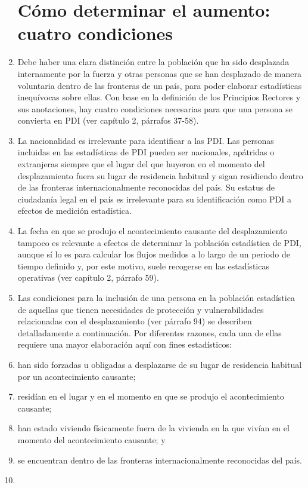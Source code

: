 \documentclass[
]{book}
\begin{document}
\begin{enumerate}
{  \section{Cómo determinar el aumento: cuatro condiciones}\label{cuxf3mo-determinar-el-aumento-cuatro-condiciones}}
\item
  Debe haber una clara distinción entre la población que ha sido desplazada internamente por la fuerza y otras personas que se han desplazado de manera voluntaria dentro de las fronteras de un país, para poder elaborar estadísticas inequívocas sobre ellas. Con base en la definición de los Principios Rectores y sus anotaciones, hay cuatro condiciones necesarias para que una persona se convierta en PDI (ver capítulo 2, párrafos 37-58).
\item
  La nacionalidad es irrelevante para identificar a las PDI. Las personas incluidas en las estadísticas de PDI pueden ser nacionales, apátridas o extranjeras siempre que el lugar del que huyeron en el momento del desplazamiento fuera su lugar de residencia habitual y sigan residiendo dentro de las fronteras internacionalmente reconocidas del país. Su estatus de ciudadanía legal en el país es irrelevante para su identificación como PDI a efectos de medición estadística.
\item
  La fecha en que se produjo el acontecimiento causante del desplazamiento tampoco es relevante a efectos de determinar la población estadística de PDI, aunque sí lo es para calcular los flujos medidos a lo largo de un periodo de tiempo definido y, por este motivo, suele recogerse en las estadísticas operativas (ver capítulo 2, párrafo 59).
\item
  Las condiciones para la inclusión de una persona en la población estadística de aquellas que tienen necesidades de protección y vulnerabilidades relacionadas con el desplazamiento (ver párrafo 94) se describen detalladamente a continuación. Por diferentes razones, cada una de ellas requiere una mayor elaboración aquí con fines estadísticos:
\item
  han sido forzadas u obligadas a desplazarse de su lugar de residencia habitual por un acontecimiento causante;
\item
  residían en el lugar y en el momento en que se produjo el acontecimiento causante;
\item
  han estado viviendo físicamente fuera de la vivienda en la que vivían en el momento del acontecimiento causante; y
\item
  se encuentran dentro de las fronteras internacionalmente reconocidas del país.
\item ~
  \hypertarget{han-sido-forzadas-u-obligadas-a-desplazarse-de-su-lugar-de-residencia-habitual-por-un-acontecimiento-causante}{%
}
\end{enumerate}
\end{document}
